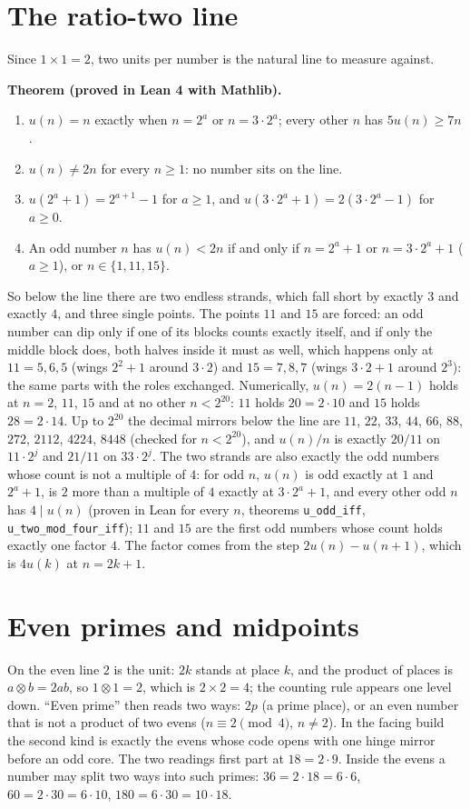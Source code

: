 \documentclass[11pt]{article}
\begin{document}
\section{The ratio-two line}
Since $1\times1 = 2$, two units per number is the natural line to measure against.

\textbf{Theorem (proved in Lean 4 with Mathlib).}
\begin{enumerate}
\item $u(n) = n$ exactly when $n = 2^a$ or $n = 3\cdot2^a$; every other $n$ has $5u(n)\ge 7n$.
\item $u(n)\ne 2n$ for every $n\ge1$: no number sits on the line.
\item $u(2^a+1) = 2^{a+1}-1$ for $a\ge1$, and $u(3\cdot2^a+1) = 2(3\cdot2^a-1)$ for $a\ge0$.
\item An odd number $n$ has $u(n) < 2n$ if and only if $n = 2^a+1$ or $n = 3\cdot2^a+1$ ($a\ge1$), or $n\in\{1, 11, 15\}$.
\end{enumerate}
So below the line there are two endless strands, which fall short by exactly $3$ and exactly $4$, and three single points. The points $11$ and $15$ are forced: an odd number can dip only if one of its blocks counts exactly itself, and if only the middle block does, both halves inside it must as well, which happens only at $11 = 5,6,5$ (wings $2^2+1$ around $3\cdot2$) and $15 = 7,8,7$ (wings $3\cdot2+1$ around $2^3$): the same parts with the roles exchanged. Numerically, $u(n) = 2(n-1)$ holds at $n = 2$, $11$, $15$ and at no other $n<2^{20}$: $11$ holds $20 = 2\cdot10$ and $15$ holds $28 = 2\cdot14$. Up to $2^{20}$ the decimal mirrors below the line are $11$, $22$, $33$, $44$, $66$, $88$, $272$, $2112$, $4224$, $8448$ (checked for $n<2^{20}$), and $u(n)/n$ is exactly $20/11$ on $11\cdot2^j$ and $21/11$ on $33\cdot2^j$. The two strands are also exactly the odd numbers whose count is not a multiple of $4$: for odd $n$, $u(n)$ is odd exactly at $1$ and $2^a+1$, is $2$ more than a multiple of $4$ exactly at $3\cdot2^a+1$, and every other odd $n$ has $4\mid u(n)$ (proven in Lean for every $n$, theorems \texttt{u\_odd\_iff}, \texttt{u\_two\_mod\_four\_iff}); $11$ and $15$ are the first odd numbers whose count holds exactly one factor $4$. The factor comes from the step $2u(n)-u(n{+}1)$, which is $4u(k)$ at $n = 2k+1$.

\section{Even primes and midpoints}
On the even line $2$ is the unit: $2k$ stands at place $k$, and the product of places is $a\otimes b = 2ab$, so $1\otimes1 = 2$, which is $2\times2 = 4$; the counting rule appears one level down. ``Even prime'' then reads two ways: $2p$ (a prime place), or an even number that is not a product of two evens ($n\equiv 2 \pmod 4$, $n\ne2$). In the facing build the second kind is exactly the evens whose code opens with one hinge mirror before an odd core. The two readings first part at $18 = 2\cdot9$. Inside the evens a number may split two ways into such primes: $36 = 2\cdot18 = 6\cdot6$, $60 = 2\cdot30 = 6\cdot10$, $180 = 6\cdot30 = 10\cdot18$.
\end{document}
